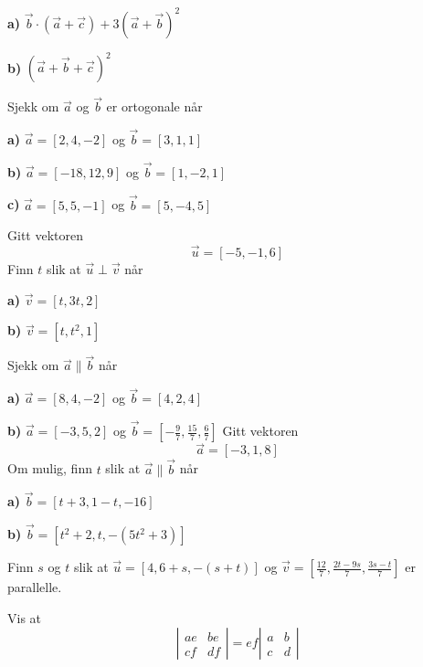 \textbf{a)} $ \vec{b}\cdot(\vec{a}+\vec{c}) + 3(\vec{a}+\vec{b})^2 $ \os

\textbf{b)} $ (\vec{a}+ \vec{b}+\vec{c})^2$

\nes
{}
Sjekk om $ \vec{a} $ og $ \vec{b} $ er ortogonale når\os

\textbf{a)} $ \vec{a}=[2, 4, -2] $ og $ \vec{b}=[3, 1, 1] $\os

\textbf{b)} $ \vec{a}=[-18, 12, 9] $ og $ \vec{b}=[1, -2, 1] $\os

\textbf{c)} $ \vec{a}=[5, 5, -1] $ og $ \vec{b}=[5, -4, 5] $

Gitt vektoren
\[ \vec{u}=[-5, -1, 6] \]
Finn $ t $ slik at $ \vec{u}\perp \vec{v} $ når\os

\textbf{a)} $ \vec{v}=[t, 3t, 2] $\os

\textbf{b)} $ \vec{v}=[t, t^2, 1] $

Sjekk om $ \vec{a}\parallel\vec{b} $ når\os

\textbf{a)} $ \vec{a}=[8, 4, -2] $ og $ \vec{b}=[4, 2, 4] $\os

\textbf{b)} $ \vec{a}=[-3, 5, 2] $ og $ \vec{b}=\left[-\frac{9}{7}, \frac{15}{7}, \frac{6}{7}\right] $ 
\newpage
{}
Gitt vektoren 
\[ \vec{a}=[-3, 1, 8] \]
Om mulig, finn $ t $ slik at $ \vec{a}\parallel\vec{b} $ når\os

\textbf{a)} $ \vec{b}=[t+3, 1-t, -16] $\os

\textbf{b)} $ \vec{b}=[t^2+2, t, -(5t^2+3)] $

Finn $ s $ og $ t $ slik at $\vec{u}=[4, 6+s, -(s+t)] $ og $ \vec{v}=\left[\frac{12}{7}, \frac{2t-9s}{7}, \frac{3s-t}{7}\right] $ er parallelle. \os

\nes
{}
Vis at
\[  \left|\begin{matrix}
ae & be \\
cf & df
\end{matrix}\right|=ef\left|\begin{matrix}
a & b \\
c & d
\end{matrix}\right| \]

\begin{comment}
\opl{arparo}
Finn aralet til parallellogrammet utspent av (\textsl{Tips:} Bruk resultatet fra opg. \ref{vis22det}):

\textbf{a)} $ [-2, 7] $ og $ [12, 8] $

\textbf{b)} $ [-2, 4] $ og $ [24, -16] $\\
\end{comment}

